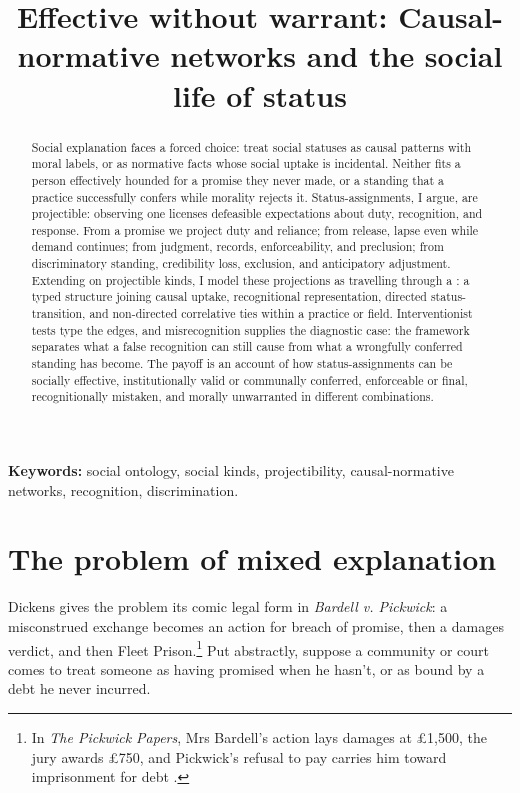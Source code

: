 \documentclass[12pt]{article}
\title{Effective without warrant: Causal-normative networks and the social life of status}
\author{}
\date{}
\begin{document}
\maketitle

\begin{abstract}
Social explanation faces a forced choice: treat social statuses as causal patterns with moral labels, or as normative facts whose social uptake is incidental. Neither fits a person effectively hounded for a promise they never made, or a standing that a practice successfully confers while morality rejects it. Status-assignments, I argue, are projectible: observing one licenses defeasible expectations about duty, recognition, and response. From a promise we project duty and reliance; from release, lapse even while demand continues; from judgment, records, enforceability, and preclusion; from discriminatory standing, credibility loss, exclusion, and anticipatory adjustment. Extending \textcite{khalidi2018nodes} on projectible kinds, I model these projections as travelling through a : a typed structure joining causal uptake, recognitional representation, directed status-transition, and non-directed correlative ties within a practice or field. Interventionist tests type the edges, and misrecognition supplies the diagnostic case: the framework separates what a false recognition can still cause from what a wrongfully conferred standing has become. The payoff is an account of how status-assignments can be socially effective, institutionally valid or communally conferred, enforceable or final, recognitionally mistaken, and morally unwarranted in different combinations.
\end{abstract}

\noindent\textbf{Keywords:} social ontology, social kinds, projectibility, causal-normative networks, recognition, discrimination.

\section{The problem of mixed explanation}
\label{sec:problem}

Dickens gives the problem its comic legal form in \emph{Bardell v. Pickwick}: a misconstrued exchange becomes an action for breach of promise, then a damages verdict, and then Fleet Prison.\footnote{In \emph{The Pickwick Papers}, Mrs Bardell's action lays damages at \pounds 1,500, the jury awards \pounds 750, and Pickwick's refusal to pay carries him toward imprisonment for debt \citep[chaps.~26, 34, 40--41]{dickens1837PickwickPapers}.} Put abstractly, suppose a community or court comes to treat someone as having promised when he hasn't, or as bound by a debt he never incurred.
\end{document}
